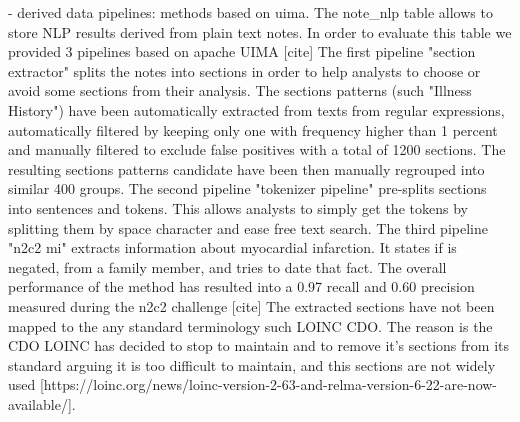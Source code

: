 - derived data pipelines: methods based on uima.
The note_nlp table allows to store NLP results derived from plain text notes. In order to evaluate this table we provided 3 pipelines based on apache UIMA [cite]
The first pipeline "section extractor" splits the notes into sections in order to help analysts to choose or avoid some sections from their analysis. The sections patterns (such "Illness History") have been automatically extracted from texts from regular expressions, automatically filtered by keeping only one with frequency higher than 1 percent and manually filtered to exclude false positives with a total of 1200 sections. The resulting sections patterns candidate have been then manually regrouped into similar 400 groups. 
The second pipeline "tokenizer pipeline" pre-splits sections into sentences and tokens. This allows analysts to simply get the tokens by splitting them by space character and ease free text search.
The third pipeline "n2c2 mi" extracts information about myocardial infarction. It states if is negated, from a family member, and tries to date that fact. The overall performance of the method has resulted into a 0.97 recall and 0.60 precision measured during the n2c2 challenge [cite]
The extracted sections have not been mapped to the any standard terminology such LOINC CDO. The reason is the CDO LOINC has decided to stop to maintain and to remove it's sections from its standard arguing it is too difficult to maintain, and this sections are not widely used [https://loinc.org/news/loinc-version-2-63-and-relma-version-6-22-are-now-available/].
